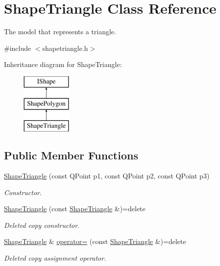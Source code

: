 \hypertarget{class_shape_triangle}{}\section{Shape\+Triangle Class Reference}
\label{class_shape_triangle}


The model that represents a triangle.  




{\ttfamily \#include $<$shapetriangle.\+h$>$}

Inheritance diagram for Shape\+Triangle\+:\begin{figure}[H]
\begin{center}
\leavevmode
\includegraphics[height=3.000000cm]{class_shape_triangle}
\end{center}
\end{figure}
\subsection*{Public Member Functions}
\begin{DoxyCompactItemize}
\item 
\mbox{\hyperlink{class_shape_triangle_af7c4c0ede5f96f158702d38fb96ed830}{Shape\+Triangle}} (const Q\+Point p1, const Q\+Point p2, const Q\+Point p3)
\begin{DoxyCompactList}\small\item\em Constructor. \end{DoxyCompactList}\item 
\mbox{\hyperlink{class_shape_triangle_a582cb4c87f64b02af8afa2300dcf72e0}{Shape\+Triangle}} (const \mbox{\hyperlink{class_shape_triangle}{Shape\+Triangle}} \&)=delete
\begin{DoxyCompactList}\small\item\em Deleted copy constructor. \end{DoxyCompactList}\item 
\mbox{\hyperlink{class_shape_triangle}{Shape\+Triangle}} \& \mbox{\hyperlink{class_shape_triangle_a4e97313348c0e825621cff5193e5d1a8}{operator=}} (const \mbox{\hyperlink{class_shape_triangle}{Shape\+Triangle}} \&)=delete
\begin{DoxyCompactList}\small\item\em Deleted copy assignment operator. \end{DoxyCompactList}\end{DoxyCompactItemize}
